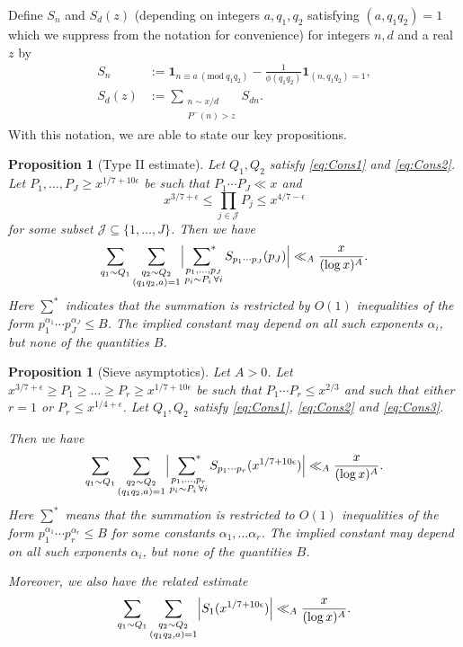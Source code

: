 \documentclass[10pt]{amsart}
\theoremstyle{plain}
\newtheorem{prpstn}[thrm]{Proposition}
\numberwithin{equation}{section}
\newcommand{\Mod}[1]{\ (\mathrm{mod}\ #1)}
\begin{document}
Define $S_n$ and $S_d(z)$ (depending on integers $a,q_1,q_2$ satisfying $(a,q_1q_2)=1$ which we suppress from the notation for convenience) for integers $n,d$ and a real $z$ by
\begin{align*}
S_n&:=\mathbf{1}_{n\equiv a\Mod{q_1q_2}}-\frac{1}{\phi(q_1q_2)}\mathbf{1}_{(n,q_1q_2)=1},\\
S_d(z)&:=\sum_{\substack{n\sim x/d\\ P^-(n)>z}}S_{d n}.
\end{align*}
With this notation, we are able to state our key propositions.
%
%
%
%
%
%
%
%
\begin{prpstn}[Type II estimate]\label{prpstn:TypeII2}
Let $Q_1,Q_2 $ satisfy \eqref{eq:Cons1} and \eqref{eq:Cons2}. Let $P_1,\dots, P_J\ge x^{1/7+10\epsilon}$ be such that $P_1\cdots P_J\ll x$ and
\[
x^{3/7+\epsilon}\le\prod_{j\in\mathcal{J}}P_j\le x^{4/7-\epsilon}
\]
for some subset $\mathcal{J}\subseteq\{1,\dots,J\}$. Then we have
\[
\sum_{q_1\sim Q_1}\sum_{\substack{q_2\sim Q_2\\ (q_1q_2,a)=1}}\Bigl|\mathop{\sideset{}{^*}\sum}_{\substack{p_1,\dots,p_J\\ p_i\sim P_i\,\forall i}}S_{p_1\cdots p_J}(p_J)\Bigr|\ll_A\frac{x}{(\log{x})^A}.
\]
Here $\sum^*$ indicates that the summation is restricted by $O(1)$ inequalities of the form $p_1^{\alpha_1}\cdots p_J^{\alpha_J}\le B$. The implied constant may depend on all such exponents $\alpha_i$, but none of the quantities $B$.
\end{prpstn}
%
%
%
%
%
%
%
%
\begin{prpstn}[Sieve asymptotics]\label{prpstn:SieveAsymptotic}
Let $A>0$. Let $x^{3/7+\epsilon}\ge P_1\ge \dots \ge P_r\ge x^{1/7+10\epsilon}$ be such that $P_1\cdots P_r\le x^{2/3}$ and such that either $r=1$ or $P_r\le x^{1/4+\epsilon}$. Let $Q_1,Q_2$ satisfy \eqref{eq:Cons1}, \eqref{eq:Cons2} and \eqref{eq:Cons3}.

Then we have
\[
\sum_{q_1\sim Q_1}\sum_{\substack{q_2\sim Q_2\\ (q_1q_2,a)=1}} \Bigl|\mathop{\sideset{}{^*}\sum}_{\substack{p_1,\dots,p_r\\ p_i\sim P_i\,\forall i}} S_{p_1\cdots p_r}(x^{1/7+10\epsilon})\Bigr|\ll_{A}\frac{x}{(\log{x})^A}.
\]
Here $\sum^*$ means that the summation is restricted to $O(1)$ inequalities of the form $p_1^{\alpha_1}\cdots p_r^{\alpha_r}\le B$ for some constants $\alpha_1,\dots \alpha_r$. The implied constant may depend on all such exponents $\alpha_i$, but none of the quantities $B$.

Moreover, we also have the related estimate
\[
\sum_{q_1\sim Q_1}\sum_{\substack{q_2\sim Q_2\\ (q_1q_2,a)=1}} \Bigl|S_{1}(x^{1/7+10\epsilon})\Bigr|\ll_{A}\frac{x}{(\log{x})^A}.
\]
\end{prpstn}
\end{document}
